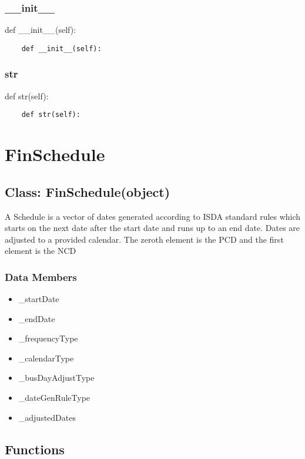\documentclass[twoside,11pt]{book}
\begin{document}
\subsubsection*{{\bf \_\_init\_\_}}
def \_\_init\_\_(self): 

\begin{lstlisting}
    def __init__(self):
\end{lstlisting}

\subsubsection*{{\bf str}}
def str(self): 

\begin{lstlisting}
    def str(self):
\end{lstlisting}

\newpage
\section{FinSchedule}

\subsection*{Class: FinSchedule(object)}
A Schedule is a vector of dates generated according to ISDA standard rules which starts on the next date after the start date and runs up to an end date. Dates are adjusted to a provided calendar. The zeroth element is the PCD and the first element is the NCD  

\subsubsection*{Data Members}
\begin{itemize}
\item{\_startDate}
\item{\_endDate}
\item{\_frequencyType}
\item{\_calendarType}
\item{\_busDayAdjustType}
\item{\_dateGenRuleType}
\item{\_adjustedDates}
\end{itemize}

\subsection*{Functions}
\end{document}
